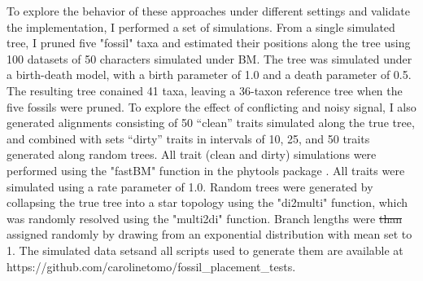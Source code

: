 \documentclass[12pt]{article}
\providecommand{\DIFadd}[1]{{\protect\color{blue}\uwave{#1}}} %
\providecommand{\DIFdel}[1]{{\protect\color{red}\sout{#1}}}                      %
\providecommand{\DIFaddbegin}{} %
\providecommand{\DIFaddend}{} %
\providecommand{\DIFdelbegin}{} %
\providecommand{\DIFdelend}{} %
\newcommand{\DIFscaledelfig}{0.5}
\newlength{\DIFdelgraphicswidth} %
\newlength{\DIFdelgraphicsheight} %
\newcommand{\DIFaddincludegraphics}[2][]{{\color{blue}\fbox{\DIFOincludegraphics[#1]{#2}}}} %
\newcommand{\DIFdelincludegraphics}[2][]{%
\sbox{\DIFdelgraphicsbox}{\DIFOincludegraphics[#1]{#2}}%
\settoboxwidth{\DIFdelgraphicswidth}{\DIFdelgraphicsbox} %
\settoboxtotalheight{\DIFdelgraphicsheight}{\DIFdelgraphicsbox} %
\scalebox{\DIFscaledelfig}{%
\parbox[b]{\DIFdelgraphicswidth}{\usebox{\DIFdelgraphicsbox}\\[-\baselineskip] \rule{\DIFdelgraphicswidth}{0em}}\llap{\resizebox{\DIFdelgraphicswidth}{\DIFdelgraphicsheight}{%
\setlength{\unitlength}{\DIFdelgraphicswidth}%
\begin{picture}(1,1)%
\thicklines\linethickness{2pt} %
{\color[rgb]{1,0,0}\put(0,0){\framebox(1,1){}}}%
{\color[rgb]{1,0,0}\put(0,0){\line( 1,1){1}}}%
{\color[rgb]{1,0,0}\put(0,1){\line(1,-1){1}}}%
\end{picture}%
}\hspace*{3pt}}} %
} %
\DeclareRobustCommand{\DIFaddbegin}{\DIFOaddbegin \let\includegraphics\DIFaddincludegraphics} %
\DeclareRobustCommand{\DIFaddend}{\DIFOaddend \let\includegraphics\DIFOincludegraphics} %
\DeclareRobustCommand{\DIFdelbegin}{\DIFOdelbegin \let\includegraphics\DIFdelincludegraphics} %
\DeclareRobustCommand{\DIFdelend}{\DIFOaddend \let\includegraphics\DIFOincludegraphics} %
\begin{document}
To explore the behavior of these approaches under different settings and 
validate the implementation, I performed a set of simulations. From a
single simulated tree, I pruned five "fossil" taxa and
estimated their positions along the tree using 100 datasets of 50
characters simulated under BM. The tree was simulated under a
birth-death model, with a birth parameter of 1.0 and a death parameter
of 0.5. The resulting tree conained 41 taxa,
leaving a 36-taxon reference tree when the five fossils were pruned. To
explore the effect of conflicting and noisy signal, I also generated
alignments consisting of 50 ``clean'' traits simulated along the true
tree, and combined with sets ``dirty'' traits in intervals of
10, 25, and 50 traits generated along random trees. All trait (clean and dirty) simulations were
performed using the "fastBM" function in the phytools package \citep{revell2012phytools}. 
All traits were simulated using a rate parameter of 1.0. Random trees
were generated by collapsing the true tree into a star topology using
the "di2multi" function, which was randomly resolved using the "multi2di" function.
Branch lengths were \DIFdelbegin \DIFdel{than }\DIFdelend \DIFaddbegin \DIFadd{then }\DIFaddend assigned randomly by drawing from an exponential
distribution with mean set to 1. The simulated data sets\DIFaddbegin \DIFadd{, Newick trees, }\DIFaddend and all scripts used
to generate them are available at https://github.com/carolinetomo/fossil\_placement\_tests. 
\end{document}
